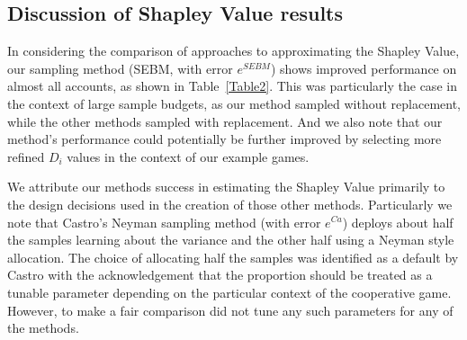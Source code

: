 
\subsection{Discussion of Shapley Value results}\label{subsection:discussion_shapley}

In considering the comparison of approaches to approximating the Shapley Value, our sampling method (SEBM, with error $e^{SEBM}$) shows improved performance on almost all accounts, as shown in Table~\ref{Table2}.
This was particularly the case in the context of large sample budgets, as our method sampled without replacement, while the other methods sampled with replacement.
And we also note that our method's performance could potentially be further improved by selecting more refined $D_i$ values in the context of our example games.

We attribute our methods success in estimating the Shapley Value primarily to the design decisions used in the creation of those other methods.
Particularly we note that Castro's Neyman sampling method (with error $e^{Ca}$) deploys about half the samples learning about the variance and the other half using a Neyman style allocation.
The choice of allocating half the samples was identified as a default by Castro with the acknowledgement that the proportion should be treated as a tunable parameter depending on the particular context of the cooperative game.
However, to make a fair comparison did not tune any such parameters for any of the methods.

